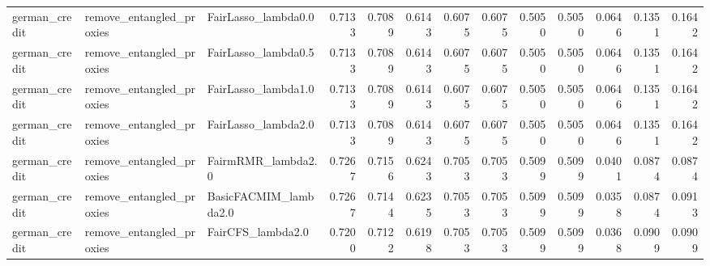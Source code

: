 \begin{tabular}{lllrrrrrrrrrr}
german_credit & remove_entangled_proxies & FairLasso_lambda0.0 & 0.7133 & 0.7089 & 0.6143 & 0.6075 & 0.6075 & 0.5050 & 0.5050 & 0.0646 & 0.1351 & 0.1642 \\
german_credit & remove_entangled_proxies & FairLasso_lambda0.5 & 0.7133 & 0.7089 & 0.6143 & 0.6075 & 0.6075 & 0.5050 & 0.5050 & 0.0646 & 0.1351 & 0.1642 \\
german_credit & remove_entangled_proxies & FairLasso_lambda1.0 & 0.7133 & 0.7089 & 0.6143 & 0.6075 & 0.6075 & 0.5050 & 0.5050 & 0.0646 & 0.1351 & 0.1642 \\
german_credit & remove_entangled_proxies & FairLasso_lambda2.0 & 0.7133 & 0.7089 & 0.6143 & 0.6075 & 0.6075 & 0.5050 & 0.5050 & 0.0646 & 0.1351 & 0.1642 \\
german_credit & remove_entangled_proxies & FairmRMR_lambda2.0 & 0.7267 & 0.7156 & 0.6243 & 0.7053 & 0.7053 & 0.5099 & 0.5099 & 0.0401 & 0.0874 & 0.0874 \\
german_credit & remove_entangled_proxies & BasicFACMIM_lambda2.0 & 0.7267 & 0.7144 & 0.6235 & 0.7053 & 0.7053 & 0.5099 & 0.5099 & 0.0358 & 0.0874 & 0.0913 \\
german_credit & remove_entangled_proxies & FairCFS_lambda2.0 & 0.7200 & 0.7122 & 0.6198 & 0.7053 & 0.7053 & 0.5099 & 0.5099 & 0.0368 & 0.0909 & 0.0909 \\
\bottomrule
\end{tabular}
